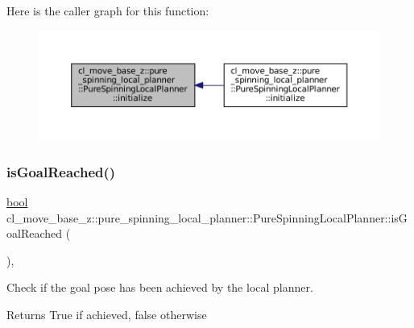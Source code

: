 Here is the caller graph for this function\+:
\nopagebreak
\begin{figure}[H]
\begin{center}
\leavevmode
\includegraphics[width=350pt]{classcl__move__base__z_1_1pure__spinning__local__planner_1_1PureSpinningLocalPlanner_a12fc5253f53f66e3e9735a72ebc9343f_icgraph}
\end{center}
\end{figure}
\mbox{\label{classcl__move__base__z_1_1pure__spinning__local__planner_1_1PureSpinningLocalPlanner_ae97111281935628a23cfca3c65f5d8c7}} 
\subsubsection{\texorpdfstring{is\+Goal\+Reached()}{isGoalReached()}}
{\footnotesize\ttfamily \hyperlink{classbool}{bool} cl\+\_\+move\+\_\+base\+\_\+z\+::pure\+\_\+spinning\+\_\+local\+\_\+planner\+::\+Pure\+Spinning\+Local\+Planner\+::is\+Goal\+Reached (\begin{DoxyParamCaption}{ }\end{DoxyParamCaption})\hspace{0.3cm}{\ttfamily [override]}, {\ttfamily [virtual]}}



Check if the goal pose has been achieved by the local planner. 

\begin{DoxyReturn}{Returns}
True if achieved, false otherwise 
\end{DoxyReturn}


